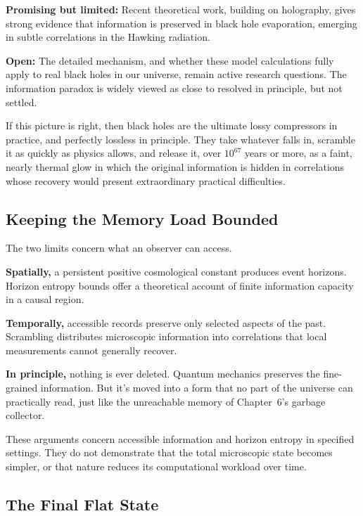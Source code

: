 \begin{researchnotebox}
\textbf{Promising but limited:} Recent theoretical work, building on holography, gives strong evidence that information is preserved in black hole evaporation, emerging in subtle correlations in the Hawking radiation.

\textbf{Open:} The detailed mechanism, and whether these model calculations fully apply to real black holes in our universe, remain active research questions. The information paradox is widely viewed as close to resolved in principle, but not settled.
\end{researchnotebox}

If this picture is right, then black holes are the ultimate lossy compressors in practice, and perfectly lossless in principle. They take whatever falls in, scramble it as quickly as physics allows, and release it, over \(10^{67}\) years or more, as a faint, nearly thermal glow in which the original information is hidden in correlations whose recovery would present extraordinary practical difficulties.

\subsection{Keeping the Memory Load Bounded}

The two limits concern what an observer can access.

\textbf{Spatially,} a persistent positive cosmological constant produces event horizons. Horizon entropy bounds offer a theoretical account of finite information capacity in a causal region.

\textbf{Temporally,} accessible records preserve only selected aspects of the past. Scrambling distributes microscopic information into correlations that local measurements cannot generally recover.

\textbf{In principle,} nothing is ever deleted. Quantum mechanics preserves the fine-grained information. But it's moved into a form that no part of the universe can practically read, just like the unreachable memory of Chapter~6's garbage collector.

These arguments concern accessible information and horizon entropy in specified settings. They do not demonstrate that the total microscopic state becomes simpler, or that nature reduces its computational workload over time.

\subsection{The Final Flat State}


